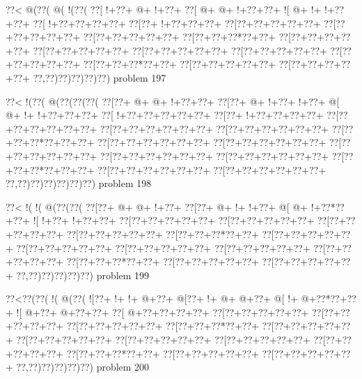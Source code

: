 \vbox{\vbox{\goo
\0??<\- @(\0??(\- @(\- !(\0??(
\0??[\- !+\0??+\- @+\- !+\0??+
\0??[\- @+\- @+\- !+\0??+\0??+
\- ![\- @+\- !+\- !+\0??+\0??+
\0??[\- !+\0??+\0??+\0??+\0??+
\0??[\0??+\- !+\0??+\0??+\0??+
\0??[\0??+\0??+\0??+\0??+\0??+
\0??[\0??+\0??+\0??+\0??+\0??+
\0??[\0??+\0??+\0??+\0??+\0??+
\0??[\0??+\0??+\0??*\0??+\0??+
\0??[\0??+\0??+\0??+\0??+\0??+
\0??[\0??+\0??+\0??+\0??+\0??+
\0??[\0??+\0??+\0??+\0??+\0??+
\0??[\0??+\0??+\0??+\0??+\0??+
\0??[\0??+\0??+\0??+\0??+\0??+
\0??[\0??+\0??+\0??*\0??+\0??+
\0??[\0??+\0??+\0??+\0??+\0??+
\0??[\0??+\0??+\0??+\0??+\0??+
\0??,\0??)\0??)\0??)\0??)\0??)
}
\hfil problem 197\hfil\break
}

\vbox{\vbox{\goo
\0??<\- !(\0??(\- @(\0??(\0??(\0??(
\0??[\0??+\- @+\- @+\- !+\0??+\0??+
\0??[\0??+\- @+\- !+\0??+\- !+\0??+
\- @[\- @+\- !+\- !+\0??+\0??+\0??+
\0??[\- !+\0??+\0??+\0??+\0??+\0??+
\0??[\0??+\- !+\0??+\0??+\0??+\0??+
\0??[\0??+\0??+\0??+\0??+\0??+\0??+
\0??[\0??+\0??+\0??+\0??+\0??+\0??+
\0??[\0??+\0??+\0??+\0??+\0??+\0??+
\0??[\0??+\0??+\0??*\0??+\0??+\0??+
\0??[\0??+\0??+\0??+\0??+\0??+\0??+
\0??[\0??+\0??+\0??+\0??+\0??+\0??+
\0??[\0??+\0??+\0??+\0??+\0??+\0??+
\0??[\0??+\0??+\0??+\0??+\0??+\0??+
\0??[\0??+\0??+\0??+\0??+\0??+\0??+
\0??[\0??+\0??+\0??*\0??+\0??+\0??+
\0??[\0??+\0??+\0??+\0??+\0??+\0??+
\0??[\0??+\0??+\0??+\0??+\0??+\0??+
\0??,\0??)\0??)\0??)\0??)\0??)\0??)
}
\hfil problem 198\hfil\break
}

\vbox{\vbox{\goo
\0??<\- !(\- !(\- @(\0??(\0??(
\0??[\0??+\- @+\- @+\- !+\0??+
\0??[\0??+\- @+\- !+\- !+\0??+
\- @[\- @+\- !+\0??*\0??+\0??+
\- ![\- !+\0??+\- !+\0??+\0??+
\0??[\0??+\0??+\0??+\0??+\0??+
\0??[\0??+\0??+\0??+\0??+\0??+
\0??[\0??+\0??+\0??+\0??+\0??+
\0??[\0??+\0??+\0??+\0??+\0??+
\0??[\0??+\0??+\0??*\0??+\0??+
\0??[\0??+\0??+\0??+\0??+\0??+
\0??[\0??+\0??+\0??+\0??+\0??+
\0??[\0??+\0??+\0??+\0??+\0??+
\0??[\0??+\0??+\0??+\0??+\0??+
\0??[\0??+\0??+\0??+\0??+\0??+
\0??[\0??+\0??+\0??*\0??+\0??+
\0??[\0??+\0??+\0??+\0??+\0??+
\0??[\0??+\0??+\0??+\0??+\0??+
\0??,\0??)\0??)\0??)\0??)\0??)
}
\hfil problem 199\hfil\break
}

\vbox{\vbox{\goo
\0??<\0??(\0??(\- !(\- @(\0??(
\- ![\0??+\- !+\- !+\- @+\0??+
\- @[\0??+\- !+\- @+\- @+\0??+
\- @[\- !+\- @+\0??*\0??+\0??+
\- ![\- @+\0??+\- @+\0??+\0??+
\0??[\- @+\0??+\0??+\0??+\0??+
\0??[\0??+\0??+\0??+\0??+\0??+
\0??[\0??+\0??+\0??+\0??+\0??+
\0??[\0??+\0??+\0??+\0??+\0??+
\0??[\0??+\0??+\0??*\0??+\0??+
\0??[\0??+\0??+\0??+\0??+\0??+
\0??[\0??+\0??+\0??+\0??+\0??+
\0??[\0??+\0??+\0??+\0??+\0??+
\0??[\0??+\0??+\0??+\0??+\0??+
\0??[\0??+\0??+\0??+\0??+\0??+
\0??[\0??+\0??+\0??*\0??+\0??+
\0??[\0??+\0??+\0??+\0??+\0??+
\0??[\0??+\0??+\0??+\0??+\0??+
\0??,\0??)\0??)\0??)\0??)\0??)
}
\hfil problem 200\hfil\break
}

